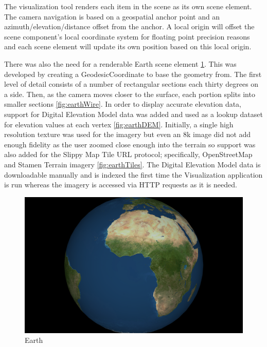 The visualization tool renders each item in the scene as its own scene element.
The camera navigation is based on a geospatial anchor point and an
azimuth/elevation/distance offset from the anchor. A local origin will offset
the scene component's local coordinate system for floating point precision
reasons and each scene element will update its own position based on this local
origin.

There was also the need for a renderable Earth scene element \ref{fig:earth}.
This was developed by creating a GeodesicCoordinate to base the geometry from. The first level of
detail consists of a number of rectangular sections each thirty degrees on a
side. Then, as the camera moves closer to the surface, each portion splits into
smaller sections \ref{fig:earthWire}. In order to display accurate elevation
data, support for Digital Elevation Model data was added and used as a lookup
dataset for elevation values at each vertex \ref{fig:earthDEM}. Initially, a
single high resolution texture was used for the imagery but even an 8k image did
not add enough fidelity as the user zoomed close enough into the terrain so
support was also added for the Slippy Map Tile URL protocol; specifically,
OpenStreetMap and Stamen Terrain imagery \ref{fig:earthTiles}. The Digital
Elevation Model data is downloadable manually and is indexed the first time the
Visualization application is run whereas the imagery is accessed via HTTP
requests as it is needed.

\begin{figure}[htp]
\begin{center}
  \includegraphics[width=.75\linewidth]{images/earth.png}
  \caption{Earth}
  \label{fig:earth}
\end{center}
\end{figure}

